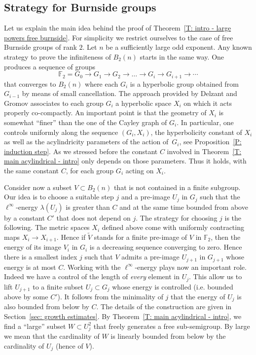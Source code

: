 \subsection{Strategy for Burnside groups}
\label{sec: strategy for burnside groups}
Let us explain the main idea behind the proof of Theorem~\ref{T: intro - large powers free burnside}.
For simplicity we restrict ourselves to the case of free Burnside groups of rank $2$.
Let $n$ be a sufficiently large odd exponent.
Any known strategy to prove the infiniteness of $B_2(n)$ starts in the same way.
One produces a sequence of groups
\begin{equation}
\label{eqn: approx sequence}
\mathbb F_2 = G_0 \to G_1 \to G_2 \to \dots \to G_i \to G_{i +1} \to \cdots
\end{equation}
that converges to $B_2(n)$ where each $G_i$ is a hyperbolic group obtained from $G_{i-1}$ by means of small cancellation.
The approach provided by Delzant and Gromov associates to each group $G_i$ a hyperbolic space $X_i$ on which it acts properly co-compactly.
An important point is that the geometry of $X_i$ is somewhat ``finer'' than the one of the Cayley graph of $G_i$.
In particular, one controls uniformly along the sequence $(G_i, X_i)$, the hyperbolicity constant of $X_i$ as well as the acylindricity parameters of the action of~$G_i$, see Proposition~\ref{P: induction step}.
As we stressed before the constant $C$ involved in Theorem~\ref{T: main acylindrical - intro} only depends on those parameters.
Thus it holds, with the same constant $C$, for each group $G_i$ acting on $X_i$.

Consider now a subset $V\subset B_2(n)$ that is not contained in a finite subgroup.
Our idea is to choose a suitable step $j$ and a pre-image $U_j$ in $G_j$ such that the $\ell^\infty$-energy $\lambda(U_j)$ is greater than $C$ and at the same time bounded from above by a constant $C'$ that does not depend on $j$.
The strategy for choosing $j$ is the following.
The metric spaces $X_i$ defined above come with uniformly contracting maps $X_i \to X_{i+1}$.
Hence if $\tilde V$ stands for a finite pre-image of $V$ in $\mathbb F_2$, then the energy of its image $V_i$ in $G_i$ is a decreasing sequence converging to zero.
Hence there is a smallest index $j$ such that $V$ admits a pre-image $U_{j+1}$ in $G_{j+1}$ whose energy is at most $C$.
Working with the $\ell^\infty$-energy plays now an important role.
Indeed we have a control of the length of \emph{every} element in $U_j$.
This allow us to lift $U_{j+1}$ to a finite subset $U_j \subset G_j$ whose energy is controlled (i.e. bounded above by some $C'$).
It follows from the minimality of $j$ that the energy of $U_j$ is also bounded from below by $C$.
The details of the construction are given in Section~\ref{sec: growth estimates}.
By Theorem~\ref{T: main acylindrical - intro}, we find a ``large'' subset $W \subset U_j^2$ that freely generates a free sub-semigroup.
By large we mean that the cardinality of $W$ is linearly bounded from below by the cardinality of $U_j$ (hence of $V$).

